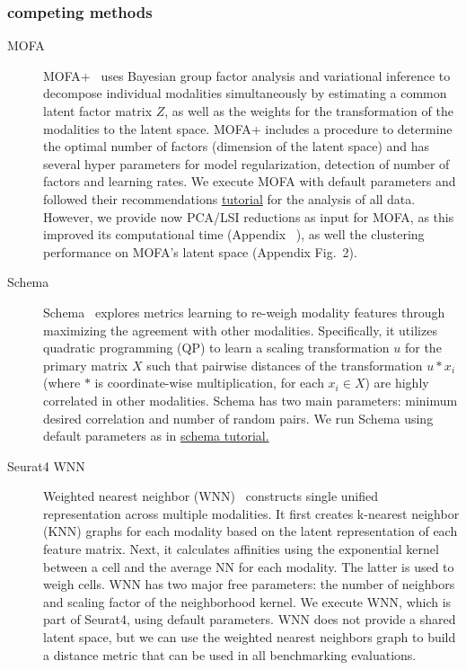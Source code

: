 \subsubsection{competing methods}
\begin{description}
\item[MOFA] 
MOFA+~\cite{argelaguet2020mofa+} uses Bayesian group factor analysis and variational inference to decompose individual modalities simultaneously by estimating a common latent factor matrix $Z$, as well as the weights for the transformation of the modalities to the latent space. MOFA+ includes a procedure to determine the optimal number of factors (dimension of the latent space) and has several hyper parameters for model regularization, detection of number of factors and learning rates. We execute MOFA with default parameters and followed their recommendations  \href{https://raw.githack.com/bioFAM/MOFA2_tutorials/master/R_tutorials/10x_scRNA_scATAC.html}{tutorial} for the analysis of all data. However, we provide now PCA/LSI reductions as input for MOFA, as this improved its computational time (Appendix ~), as well the clustering performance on MOFA's latent space (Appendix Fig.~2). 

\item[Schema]
Schema~\cite{singh2021schema} explores metrics learning to re-weigh modality features through maximizing the agreement with other modalities. Specifically, it utilizes quadratic programming (QP) to learn a scaling transformation $u$ for the primary matrix $X$ such that pairwise distances of the transformation $u *  x_i$ (where $*$ is coordinate-wise multiplication, for each $x_i\in X$) are highly correlated in other modalities. Schema has two main parameters: minimum desired correlation and number of random pairs.  We run Schema using default parameters as in 
\href{https://schema-multimodal.readthedocs.io/en/latest/recipes/index.html}{schema tutorial.} 

\item[Seurat4 WNN]
Weighted nearest neighbor (WNN)~\cite{hao2021integrated} constructs single unified representation across multiple modalities. It first creates k-nearest neighbor (KNN) graphs for each modality based on the latent representation of each feature matrix.  Next, it calculates affinities using the exponential kernel between a cell and the average NN for each modality. The latter is used to weigh cells.  WNN has two major free parameters: the number of neighbors and scaling factor of the neighborhood kernel. We execute WNN, which is part of Seurat4, using default parameters. WNN does not provide a shared latent space, but we can use the weighted nearest neighbors graph to build a distance metric that can be used in all benchmarking evaluations.


\end{description}

